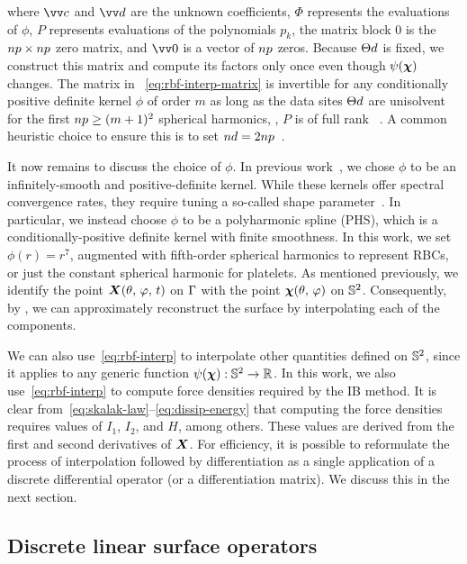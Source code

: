 where $\arr{c}$ and $\arr{d}$ are the unknown coefficients, $\Phi$ represents the
evaluations of $\phi$, $P$ represents evaluations of the polynomials $p_k$, the matrix
block $0$ is the $\poly\cardinality\times\poly\cardinality$ zero matrix, and $\arr{0}$ is
a vector of $\poly\cardinality$ zeros. Because $\data\sites$ is fixed, we construct this
matrix and compute its factors only once even though $\psi(\boldsymbol{\chi})$ changes. The matrix in~%
\eqref{eq:rbf-interp-matrix} is invertible for any conditionally positive definite kernel
$\phi$ of order $m$ as long as the data sites $\data\sites$ are unisolvent for the first
$\poly\cardinality \ge (m+1)^2$ spherical harmonics, , $P$ is of full rank~%
\cite{Fasshauer:2007ui}. A common heuristic choice to ensure this is to set
$\data\cardinality = 2 \poly\cardinality$~\cite{SWJCP2018}. 

It now remains to discuss the choice of $\phi$. In previous work~\cite{Shankar:2015km},
we chose $\phi$ to be an infinitely-smooth and positive-definite kernel. While these
kernels offer spectral convergence rates, they require tuning a so-called shape
parameter~\cite{Fasshauer:2007ui}. In particular, we instead choose $\phi$ to be a
polyharmonic spline (PHS), which is a conditionally-positive definite kernel with finite
smoothness. In this work, we set $\phi(r) = r^7$, augmented with fifth-order spherical
harmonics to represent RBCs, or just the constant spherical harmonic for platelets. As
mentioned previously, we identify the point $\boldsymbol{X}(\theta,\,\varphi,\,t)$ on $\Gamma$
with the point $\boldsymbol{\chi}(\theta,\,\varphi)$ on $\mathbb{S}^2$. Consequently, by , we can approximately reconstruct the surface by
interpolating each of the components. 

We can also use~\eqref{eq:rbf-interp} to interpolate other quantities defined on
$\mathbb{S}^2$, since it applies to any generic function $\psi(\boldsymbol{\chi}): \mathbb{S}^2 \to \mathbb{R}$.
In this work, we also use~\eqref{eq:rbf-interp} to compute force densities required by
the IB method. It is clear from~\eqref{eq:skalak-law}--\eqref{eq:dissip-energy} that
computing the force densities requires values of $I_1$, $I_2$, and $H$, among others.
These values are derived from the first and second derivatives of $\boldsymbol{X}$. For efficiency,
it is possible to reformulate the process of interpolation followed by differentiation as
a single application of a discrete differential operator (or a differentiation matrix).
We discuss this in the next section.

\subsection{Discrete linear surface operators}

